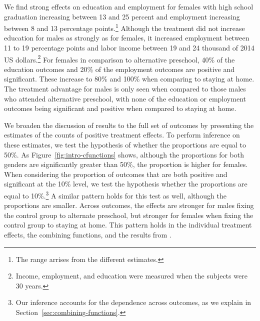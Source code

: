We find strong effects on education and employment for females with high school graduation increasing between 13 and 25 percent and employment increasing between 8 and 13 percentage points.\footnote{The range arrises from the different estimates.} Although the treatment did not increase education for males as strongly as for females, it increased employment between 11 to 19 percentage points and labor income between 19 and 24 thousand of 2014 US dollars.\footnote{Income, employment, and education were measured when the subjects were 30 years.}  For females in comparison to alternative preschool, 40\% of the education outcomes and 20\% of the employment outcomes are positive and significant. These increase to 80\% and 100\% when comparing to staying at home. The treatment advantage for males is only seen when compared to those males who attended alternative preschool, with none of the education or employment outcomes being significant and positive when compared to staying at home. 

We broaden the discussion of results to the full set of outcomes by presenting the estimates of the counts of positive treatment effects. To perform inference on these estimates, we test the hypothesis of whether the proportions are equal to 50\%. As Figure~\ref{fig:intro-cfunctions} shows, although the proportions for both genders are significantly greater than 50\%, the proportion is higher for females. When considering the proportion of outcomes that are both positive and significant at the 10\% level, we test the hypothesis whether the proportions are equal to 10\%.\footnote{Our inference accounts for the dependence across outcomes, as we explain in Section~\ref{sec:combining-functions}.} A similar pattern holds for this test as well, although the proportions are smaller. Across outcomes, the effects are stronger for males fixing the control group to alternate preschool, but stronger for females when fixing the control group to staying at home. This pattern holds in the individual treatment effects, the combining functions, and the results from \citet{Garcia_Heckman_Leaf_etal_2017_Comp_CBA_Unpublished}.

